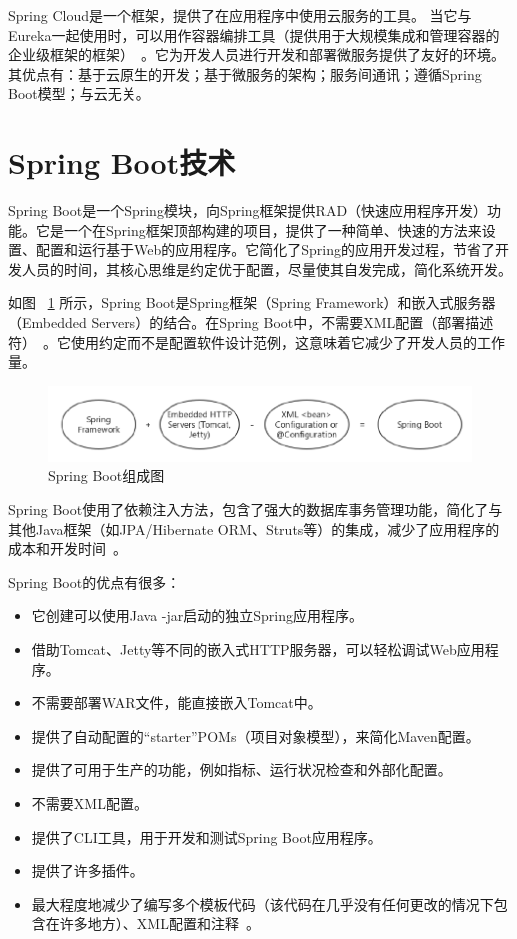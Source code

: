Spring Cloud是一个框架，提供了在应用程序中使用云服务的工具。 当它与Eureka一起使用时，可以用作容器编排工具（提供用于大规模集成和管理容器的企业级框架的框架）~\cite{cosmina2017spring}。它为开发人员进行开发和部署微服务提供了友好的环境。其优点有：基于云原生的开发；基于微服务的架构；服务间通讯；遵循Spring Boot模型；与云无关。

\section{Spring Boot技术}
Spring Boot是一个Spring模块，向Spring框架提供RAD（快速应用程序开发）功能。它是一个在Spring框架顶部构建的项目，提供了一种简单、快速的方法来设置、配置和运行基于Web的应用程序。它简化了Spring的应用开发过程，节省了开发人员的时间，其核心思维是约定优于配置，尽量使其自发完成，简化系统开发。

如图
~\ref{fig_springBootCH2}
所示，Spring Boot是Spring框架（Spring Framework）和嵌入式服务器（Embedded Servers）的结合。在Spring Boot中，不需要XML配置（部署描述符）~\cite{sharma2019mastering}。它使用约定而不是配置软件设计范例，这意味着它减少了开发人员的工作量。
\begin{figure}[htbp!]
    \centering
    \includegraphics[width=5in]{FIGs/chapter2/springBoot.pdf}
    \caption{Spring Boot组成图}\label{fig_springBootCH2}
\end{figure}

Spring Boot使用了依赖注入方法，包含了强大的数据库事务管理功能，简化了与其他Java框架（如JPA/Hibernate ORM、Struts等）的集成，减少了应用程序的成本和开发时间~\cite{walls2016spring}。

Spring Boot的优点有很多：
\begin{itemize}
    \item 它创建可以使用Java -jar启动的独立Spring应用程序。
    \item 借助Tomcat、Jetty等不同的嵌入式HTTP服务器，可以轻松调试Web应用程序。
    \item 不需要部署WAR文件，能直接嵌入Tomcat中。
    \item 提供了自动配置的“starter”POMs（项目对象模型），来简化Maven配置。
    \item 提供了可用于生产的功能，例如指标、运行状况检查和外部化配置。
    \item 不需要XML配置。
    \item 提供了CLI工具，用于开发和测试Spring Boot应用程序。
    \item 提供了许多插件。
    \item 最大程度地减少了编写多个模板代码（该代码在几乎没有任何更改的情况下包含在许多地方）、XML配置和注释~\cite{antonov2018spring}。
\end{itemize}

